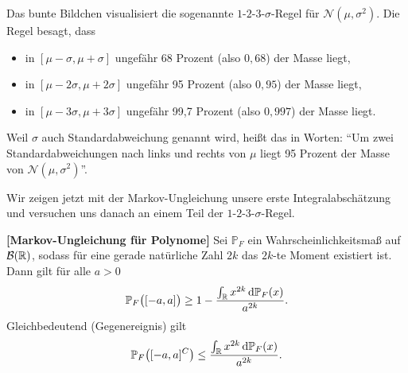 \begin{beispiel}
\begin{center}
		\end{center}
Das bunte Bildchen visualisiert die sogenannte $1$-$2$-$3$-$\sigma$-Regel f\"ur $\mathcal N(\mu,\sigma^2)$. Die Regel besagt, dass
\begin{itemize}
	\item in $[\mu-\sigma,\mu+\sigma]$ ungef\"ahr 68 Prozent (also $0,68$) der Masse liegt,
	\item in $[\mu-2\sigma,\mu+2\sigma]$ ungef\"ahr 95 Prozent (also $0,95$) der Masse liegt,
	\item in $[\mu-3\sigma,\mu+3\sigma]$ ungef\"ahr 99,7 Prozent (also $0,997$) der Masse liegt.
\end{itemize}
Weil $\sigma$ auch Standardabweichung genannt wird, hei\ss t das in Worten: \enquote{Um zwei Standardabweichungen nach links und rechts von $\mu$ liegt 95 Prozent der Masse von $\mathcal N(\mu,\sigma^2)$}.
\end{beispiel}
Wir zeigen jetzt mit der Markov-Ungleichung unsere erste Integralabsch\"atzung und versuchen uns danach an einem Teil der $1$-$2$-$3$-$\sigma$-Regel.
\begin{prop} \label{MarkovPoly}
 \textbf{[Markov-Ungleichung für Polynome]}
	Sei $\mathbb{P}_F$ ein Wahrscheinlichkeitsmaß auf $\mathcal{B}(\mathbb{R})$, sodass für eine gerade nat\"urliche Zahl $2k$ das $2k$-te Moment existiert ist. Dann gilt f\"ur alle $a>0$
	\[ \mathbb{P}_F\big([-a,a]\big) \geq 1 - \frac{\int_{\mathbb{R}} x^{2k} \, \mathrm{d} \mathbb{P}_F(x) }{a^{2k}}. \]
	Gleichbedeutend (Gegenereignis) gilt 
	\[ \mathbb{P}_F\big([-a,a]^C\big) \leq  \frac{\int_{\mathbb{R}} x^{2k} \, \mathrm{d} \mathbb{P}_F(x) }{a^{2k}}. \]
\end{prop}

